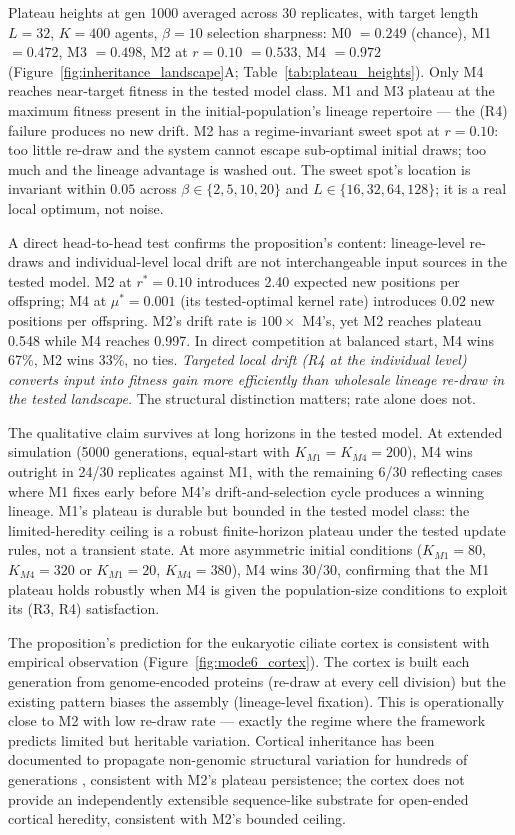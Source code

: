 \documentclass[aps,prx,reprint,amsmath,amssymb,floatfix,superscriptaddress,nofootinbib]{revtex4-2}
\theoremstyle{plain-thm}
\theoremstyle{definition-thm}
\begin{document}
Plateau heights at gen 1000 averaged across 30 replicates, with target length $L = 32$, $K = 400$ agents, $\beta = 10$ selection sharpness: M0 $= 0.249$ (chance), M1 $= 0.472$, M3 $= 0.498$, M2 at $r = 0.10$ $= 0.533$, M4 $= 0.972$ (Figure~\ref{fig:inheritance_landscape}A; Table~\ref{tab:plateau_heights}). Only M4 reaches near-target fitness in the tested model class. M1 and M3 plateau at the maximum fitness present in the initial-population's lineage repertoire --- the (R4) failure produces no new drift. M2 has a regime-invariant sweet spot at $r = 0.10$: too little re-draw and the system cannot escape sub-optimal initial draws; too much and the lineage advantage is washed out. The sweet spot's location is invariant within $0.05$ across $\beta \in \{2, 5, 10, 20\}$ and $L \in \{16, 32, 64, 128\}$; it is a real local optimum, not noise.

A direct head-to-head test confirms the proposition's content: lineage-level re-draws and individual-level local drift are not interchangeable input sources in the tested model. M2 at $r^* = 0.10$ introduces 2.40 expected new positions per offspring; M4 at $\mu^* = 0.001$ (its tested-optimal kernel rate) introduces 0.02 new positions per offspring. M2's drift rate is $100\times$ M4's, yet M2 reaches plateau 0.548 while M4 reaches 0.997. In direct competition at balanced start, M4 wins 67\%, M2 wins 33\%, no ties. \textit{Targeted local drift (R4 at the individual level) converts input into fitness gain more efficiently than wholesale lineage re-draw in the tested landscape.} The structural distinction matters; rate alone does not.

The qualitative claim survives at long horizons in the tested model. At extended simulation (5000 generations, equal-start with $K_{M1} = K_{M4} = 200$), M4 wins outright in 24/30 replicates against M1, with the remaining 6/30 reflecting cases where M1 fixes early before M4's drift-and-selection cycle produces a winning lineage. M1's plateau is durable but bounded in the tested model class: the limited-heredity ceiling is a robust finite-horizon plateau under the tested update rules, not a transient state. At more asymmetric initial conditions ($K_{M1} = 80$, $K_{M4} = 320$ or $K_{M1} = 20$, $K_{M4} = 380$), M4 wins 30/30, confirming that the M1 plateau holds robustly when M4 is given the population-size conditions to exploit its (R3, R4) satisfaction.

The proposition's prediction for the eukaryotic ciliate cortex is consistent with empirical observation (Figure~\ref{fig:mode6_cortex}). The cortex is built each generation from genome-encoded proteins (re-draw at every cell division) but the existing pattern biases the assembly (lineage-level fixation). This is operationally close to M2 with low re-draw rate --- exactly the regime where the framework predicts limited but heritable variation. Cortical inheritance has been documented to propagate non-genomic structural variation for hundreds of generations \citep{BeissonSonneborn1965}, consistent with M2's plateau persistence; the cortex does not provide an independently extensible sequence-like substrate for open-ended cortical heredity, consistent with M2's bounded ceiling.
\end{document}
